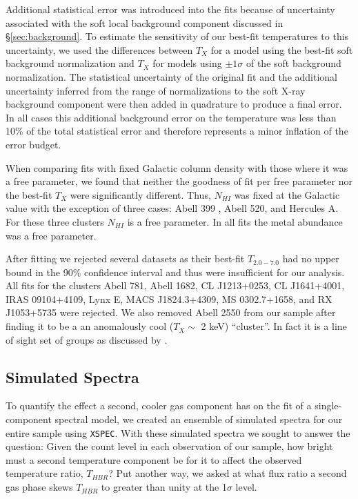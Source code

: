 \documentclass{emulateapj}
\begin{document}
Additional statistical error was introduced into the fits because of
uncertainty associated with the soft local background component
discussed in \S\ref{sec:background}. To estimate the sensitivity of
our best-fit temperatures to this uncertainty, we used the differences
between $T_{X}$ for a model using the best-fit soft background
normalization and $T_{X}$ for models using $\pm1\sigma$ of the soft
background normalization. The statistical uncertainty of the original
fit and the additional uncertainty inferred from the range of
normalizations to the soft X-ray background component were then added
in quadrature to produce a final error. In all cases this additional
background error on the temperature was less than 10\% of the total
statistical error and therefore represents a minor inflation of the
error budget.

When comparing fits with fixed Galactic column density with those
where it was a free parameter, we found that neither the goodness of
fit per free parameter nor the best-fit $T_{X}$ were significantly
different. Thus, $N_{HI}$ was fixed at the Galactic value with the
exception of three cases: Abell 399 \citep{2004MNRAS.351.1439S}, Abell
520, and Hercules A. For these three clusters $N_{HI}$ is a free
parameter. In all fits the metal abundance was a free parameter.

After fitting we rejected several datasets as their best-fit $T_{2.0-7.0}$
had no upper bound in the 90\% confidence interval and thus were
insufficient for our analysis. All fits for the clusters Abell 781,
Abell 1682, CL J1213+0253, CL J1641+4001, IRAS 09104+4109, Lynx E,
MACS J1824.3+4309, MS 0302.7+1658, and RX J1053+5735 were rejected. We
also removed Abell 2550 from our sample after finding it to be a an
anomalously cool ($T_{X} \sim$ 2 keV) ``cluster''. In fact it is a line
of sight set of groups as discussed by \cite{2004cgpc.sympE..31M}.

\subsection{Simulated Spectra}\label{sec:simulated}

To quantify the effect a second, cooler gas component has on the fit
of a single-component spectral model, we created an ensemble of simulated
spectra for our entire sample using {\tt XSPEC}. With these simulated
spectra we sought to answer the question: Given the count level in
each observation of our sample, how bright must a second temperature
component be for it to affect the observed temperature ratio,
$T_{HBR}$? Put another way, we asked at what flux ratio a second gas
phase skews $T_{HBR}$ to greater than unity at the 1$\sigma$ level.
\end{document}
